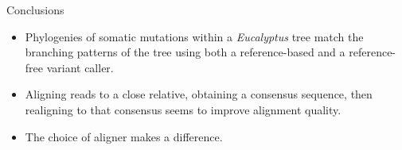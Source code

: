 \documentclass{beamer}
\begin{document}
\begin{frame}{}
\begin{columns}
\begin{block}{Conclusions}
\begin{itemize}
	\item Phylogenies of somatic mutations within a \textit{Eucalyptus} tree match the branching patterns of the tree using both a reference-based and a reference-free variant caller.
	\item Aligning reads to a close relative, obtaining a consensus sequence, then realigning to that consensus seems to improve alignment quality.
	\item The choice of aligner makes a difference.
\end{itemize}

\end{block}


\end{columns}
\end{frame}
\end{document}
